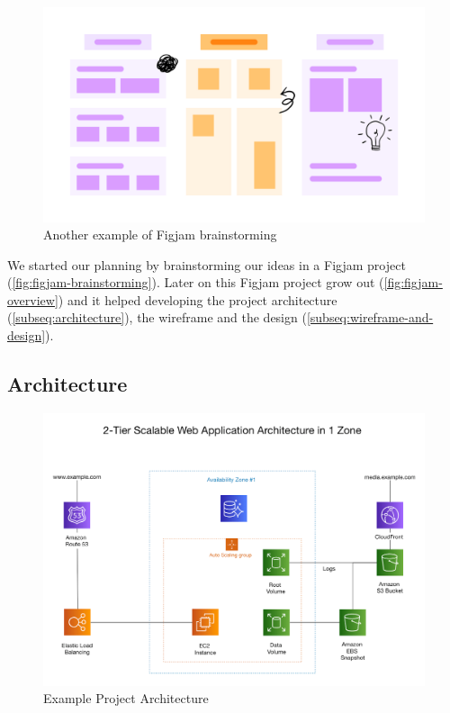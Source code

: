 \documentclass[12pt,a4paper]{article}
\begin{document}
\begin{spacing}{1.5}
    \begin{figure}[h]
        \centering
        \includegraphics[width=15cm]{assets/another-brainstorming-example.png}
        \caption{Another example of Figjam brainstorming}
        \label{fig:figjam-overview}
    \end{figure}
    \FloatBarrier

    We started our planning by brainstorming our ideas in a Figjam project
    (\autoref{fig:figjam-brainstorming}). Later on this Figjam project grow out
    (\autoref{fig:figjam-overview}) and it helped developing the project
    architecture (\autoref{subseq:architecture}), the wireframe and the design
    (\autoref{subseq:wireframe-and-design}).

    \newpage
    \subsection{Architecture}\label{subseq:architecture}

    \begin{figure}[h]
        \centering
        \includegraphics[width=16cm]{assets/architecture-example.png}
        \caption{Example Project Architecture}
        \label{fig:architecture}
    \end{figure}
    \FloatBarrier


\end{spacing}
\end{document}
